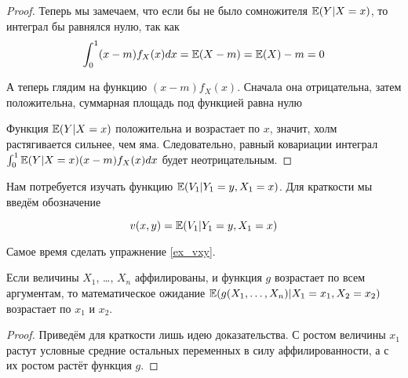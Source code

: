 \begin{proof}
Теперь мы замечаем, что если бы не было сомножителя $ \operatorname{\mathbb{E}}(Y|X=x) $, то интеграл бы равнялся нулю, так как
\begin{equation}
\int_{0}^{1}(x-m)f_{X}(x)dx=\operatorname{\mathbb{E}}(X-m)=\operatorname{\mathbb{E}}(X)-m=0
\end{equation}

А теперь глядим на функцию $ (x-m)f_{X}(x) $. Сначала она отрицательна, затем положительна, суммарная площадь под функцией равна нулю


Функция $ \operatorname{\mathbb{E}}(Y|X=x) $ положительна и возрастает по $ x $, значит, холм растягивается сильнее, чем яма. Следовательно, равный ковариации интеграл $ \int_{0}^{1}\operatorname{\mathbb{E}}(Y|X=x)(x-m)f_{X}(x)dx $ будет неотрицательным.


\end{proof}



Нам потребуется изучать функцию $ \operatorname{\mathbb{E}}(V_{1}|Y_{1}=y, X_{1}=x) $.  Для краткости мы введём обозначение

\begin{mydef}
\begin{equation}
v(x,y)=\operatorname{\mathbb{E}}(V_{1}|Y_{1}=y, X_{1}=x)
\end{equation}
\end{mydef}

Самое время сделать упражнение \ref{ex_vxy}.

\begin{myth}
\label{aff_multi_f}
Если величины $ X_{1} $, \ldots, $ X_{n} $ аффилированы, и функция $g$ возрастает по всем аргументам, то математическое ожидание $\operatorname{\mathbb{E}}(g(X_{1},\ldots,X_{n})|X_{1}=x_{1},X_{2}=x_{2}) $ возрастает по $ x_{1} $ и $ x_{2} $.
\end{myth}

\begin{proof}
Приведём для краткости лишь идею доказательства. С ростом величины $ x_{1} $ растут условные средние остальных переменных в силу аффилированности, а с их ростом растёт функция $ g $.
\end{proof}


